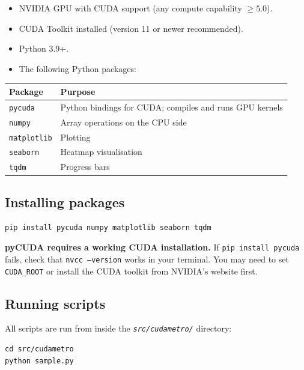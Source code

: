 \documentclass[12pt,a4paper]{article}
\newcommand{\code}[1]{\texttt{#1}}
\newcommand{\file}[1]{\texttt{\textit{#1}}}
\begin{document}
\begin{itemize}
  \item NVIDIA GPU with CUDA support (any compute capability $\geq 5.0$).
  \item CUDA Toolkit installed (version 11 or newer recommended).
  \item Python 3.9+.
  \item The following Python packages:
\end{itemize}

\begin{center}
\begin{tabular}{ll}
\toprule
\textbf{Package} & \textbf{Purpose} \\
\midrule
\code{pycuda} & Python bindings for CUDA; compiles and runs GPU kernels \\
\code{numpy} & Array operations on the CPU side \\
\code{matplotlib} & Plotting \\
\code{seaborn} & Heatmap visualisation \\
\code{tqdm} & Progress bars \\
\bottomrule
\end{tabular}
\end{center}

\subsection{Installing packages}

\begin{lstlisting}[style=bash]
pip install pycuda numpy matplotlib seaborn tqdm
\end{lstlisting}

\begin{warnbox}
\textbf{pyCUDA requires a working CUDA installation.} If \code{pip install pycuda}
fails, check that \code{nvcc --version} works in your terminal. You may need to
set \code{CUDA\_ROOT} or install the CUDA toolkit from NVIDIA's website first.
\end{warnbox}

\subsection{Running scripts}

All scripts are run from inside the \file{src/cudametro/} directory:

\begin{lstlisting}[style=bash]
cd src/cudametro
python sample.py
\end{lstlisting}
\end{document}
